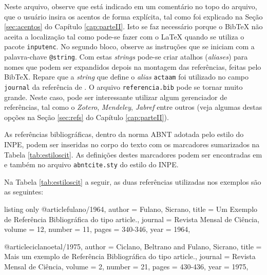 Neste arquivo, observe que está indicado em um comentário no topo do arquivo, que o usuário insira os acentos de forma explícita, tal como foi explicado na Seção \ref{sec:acentos} do Capítulo \ref{cap:parteII}. Isto se faz necessário porque o Bib\TeX{} não aceita a localização tal como pode-se fazer com o \LaTeX{} quando se utiliza o pacote {\tt inputenc}. No segundo bloco, observe as instruções que se iniciam com a palavra-chave {\tt @string}. Com estas \textit{strings} pode-se criar atalhos (\textit{aliases}) para nomes que podem ser expandidos depois na montagem das referências, feitas pelo Bib\TeX{}. Repare que a \textit{string} que define o \textit{alias} {\tt actaam} foi utilizado no campo {\tt journal} da referência de . O arquivo {\tt referencia.bib} pode se tornar muito grande. Neste caso, pode ser interessante utilizar algum gerenciador de referências, tal como o \textit{Zotero}, \textit{Mendeley}, \textit{Jabref} entre outros (veja algumas destas opções na Seção \ref{sec:refs} do Capítulo \ref{cap:parteII}). 

As referências bibliográficas, dentro da norma ABNT adotada pelo estilo do INPE, podem ser inseridas no corpo do texto com os marcadores sumarizados na Tabela \ref{tab:estiloscit}. As definições destes marcadores podem ser encontradas em  e também no arquivo {\tt abntcite.sty} do estilo do INPE.

Na Tabela \ref{tab:estiloscit} a seguir, as duas referências utilizadas nos exemplos são as seguintes:

\begin{texexp}{listing only}
@article{fulano/1964,
  author = {Fulano, Sicrano},
  title = {Um Exemplo de Refer{\^e}ncia Bibliogr{\'a}fica do tipo article.},
  journal = {Revista Mensal de Ci{\^e}ncia},
  volume = {12},
  number = {11},
  pages = {340-346},
  year = {1964},
}

@article{ciclanoetal/1975,
  author = {Ciclano, Beltrano and Fulano, Sicrano},
  title = {Mais um exemplo de Refer{\^e}ncia Bibliogr{\'a}fica do tipo article.},
  journal = {Revista Mensal de Ci{\^e}ncia},
  volume = {2},
  number = {21},
  pages = {430-436},
  year = {1975},
}
\end{texexp}

\newpage

